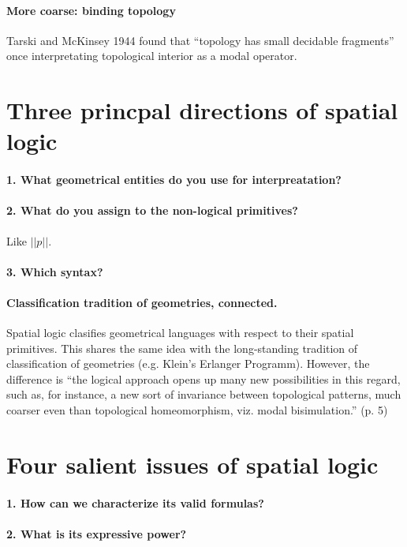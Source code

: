 \documentclass[
10pt, %
a4paper, %
twocolumn, %
landscape %
]{article}
\begin{document}
\paragraph{More coarse: binding topology}
Tarski and McKinsey 1944 found that ``topology has small decidable fragments'' once interpretating topological interior as a modal operator.

\section*{Three princpal directions of spatial logic}
\paragraph{1. What geometrical entities do you use for interpreatation?}

\paragraph{2. What do you assign to the non-logical primitives?}
Like $|| p ||$.
\paragraph{3. Which syntax?}

\paragraph{Classification tradition of geometries, connected.}
Spatial logic clasifies geometrical languages with respect to their spatial primitives. This shares the same idea with the long-standing tradition of classification of geometries (e.g. Klein's Erlanger Programm).
However, the difference is ``the logical approach opens up many new possibilities in this regard, such as, for instance, a new sort of invariance between topological patterns, much coarser even than topological homeomorphism, viz. modal bisimulation.'' (p. 5)

\section*{Four salient issues of spatial logic}
\paragraph{1. How can we characterize its valid formulas?}
\paragraph{2. What is its expressive power?}
\end{document}

